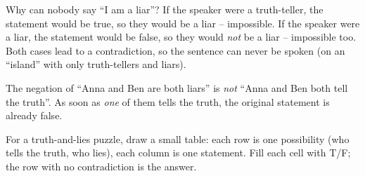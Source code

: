 \documentclass[11pt]{article}
\begin{document}
\begin{proofbox}
Why can nobody say ``I am a liar''? If the speaker were a truth-teller, the statement would be true, so they would be a liar --
impossible. If the speaker were a liar, the statement would be false, so they would \emph{not} be a liar -- impossible too. Both
cases lead to a contradiction, so the sentence can never be spoken (on an ``island'' with only truth-tellers and liars).
\end{proofbox}
\begin{warnbox}
The negation of ``Anna and Ben are both liars'' is \emph{not} ``Anna and Ben both tell the truth''. As soon as \emph{one} of them tells
the truth, the original statement is already false.
\end{warnbox}
\begin{tipbox}
For a truth-and-lies puzzle, draw a small table: each row is one possibility (who tells the truth, who lies), each column is one
statement. Fill each cell with T/F; the row with no contradiction is the answer.
\end{tipbox}
\end{document}
